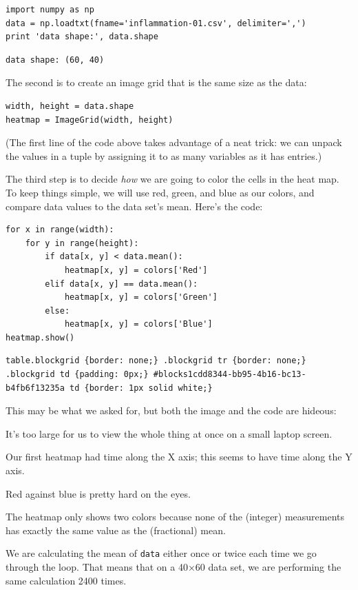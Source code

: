 \documentclass{book}
\begin{document}
\begin{verbatim}
import numpy as np
data = np.loadtxt(fname='inflammation-01.csv', delimiter=',')
print 'data shape:', data.shape
\end{verbatim}

\begin{verbatim}
data shape: (60, 40)
\end{verbatim}

The second is to create an image grid that is the same size as the data:

\begin{verbatim}
width, height = data.shape
heatmap = ImageGrid(width, height)
\end{verbatim}

(The first line of the code above takes advantage of a neat trick: we
can unpack the values in a tuple by assigning it to as many variables as
it has entries.)

The third step is to decide \emph{how} we are going to color the cells
in the heat map. To keep things simple, we will use red, green, and blue
as our colors, and compare data values to the data set's mean. Here's
the code:

\begin{verbatim}
for x in range(width):
    for y in range(height):
        if data[x, y] < data.mean():
            heatmap[x, y] = colors['Red']
        elif data[x, y] == data.mean():
            heatmap[x, y] = colors['Green']
        else:
            heatmap[x, y] = colors['Blue']
heatmap.show()
\end{verbatim}

\begin{verbatim}
table.blockgrid {border: none;} .blockgrid tr {border: none;} .blockgrid td {padding: 0px;} #blocks1cdd8344-bb95-4b16-bc13-b4fb6f13235a td {border: 1px solid white;}
\end{verbatim}

This may be what we asked for, but both the image and the code are
hideous:

\begin{swcenumerate}
\item
  It's too large for us to view the whole thing at once on a small
  laptop screen.
\item
  Our first heatmap had time along the X axis; this seems to have time
  along the Y axis.
\item
  Red against blue is pretty hard on the eyes.
\item
  The heatmap only shows two colors because none of the (integer)
  measurements has exactly the same value as the (fractional) mean.
\item
  We are calculating the mean of \texttt{data} either once or twice each
  time we go through the loop. That means that on a 40×60 data set, we
  are performing the same calculation 2400 times.
\end{swcenumerate}
\end{document}
